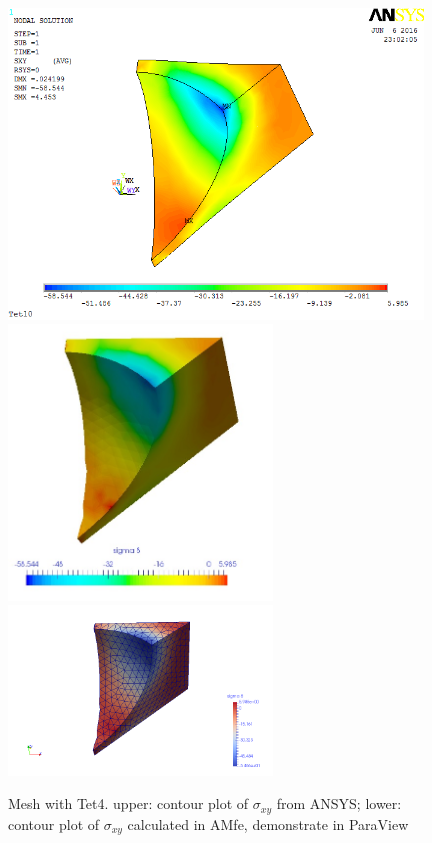 \begin{figure}[htbp]
	\begin{center}
		\includegraphics[width=11cm,clip]{Tet4Sxy.png} 		
		\includegraphics[width=7cm,clip]{Tet4SxyPD.png} 	
		\includegraphics[width=7cm,clip]{Tet4SxyP.png} 		
		\caption{Mesh with Tet4. upper: contour plot of $\sigma_{xy}$ from ANSYS; lower: contour plot of $\sigma_{xy}$ calculated in AMfe, demonstrate in ParaView} \label{fig: Tet4Sxy}
	\end{center}
\end{figure}
\clearpage 


